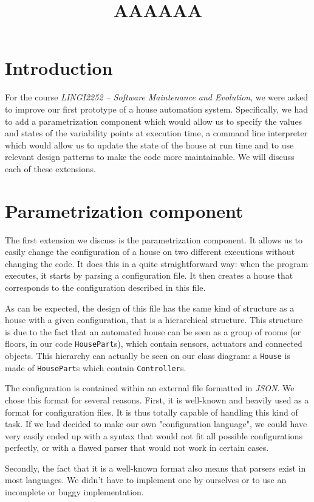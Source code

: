     \title{AAAAAA}
    \newpage

	\section{Introduction}
		For the course \textit{LINGI2252 -- Software Maintenance and Evolution}, we were asked to improve our first prototype of a house automation system. Specifically, we had to add a parametrization component which would allow us to specify the values and states of the variability points at execution time, a command line interpreter which would allow us to update the state of the house at run time and to use relevant design patterns to make the code more maintainable. We will discuss each of these extensions.

	\section{Parametrization component}
		The first extension we discuss is the parametrization component.
		It allows us to easily change the configuration of a house on two different executions without changing the code.
		It does this in a quite straightforward way: when the program executes, it starts by parsing a configuration file. It then creates a house that corresponds to the configuration described in this file.
		
		As can be expected, the design of this file has the same kind of structure as a house with a given configuration, that is a hierarchical structure. This structure is due to the fact that an automated house can be seen as a group of rooms (or floors, in our code \texttt{HousePart}s), which contain sensors, actuators and connected objects. This hierarchy can actually be seen on our class diagram: a \texttt{House} is made of \texttt{HousePart}s which contain \texttt{Controller}s.
		
		The configuration is contained within an external file formatted in \textit{JSON}. We chose this format for several reasons.
		First, it is well-known and heavily used as a format for configuration files. It is thus totally capable of handling this kind of task. If we had decided to make our own "configuration language", we could have very easily ended up with a syntax that would not fit all possible configurations perfectly, or with a flawed parser that would not work in certain cases.

		Secondly, the fact that it is a well-known format also means that parsers exist in most languages. We didn't have to implement one by ourselves or to use an incomplete or buggy implementation.

